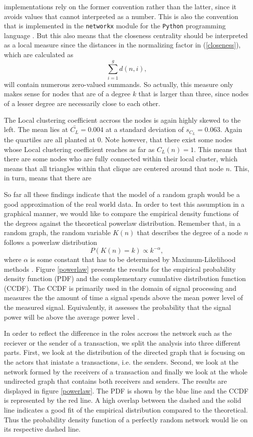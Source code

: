 \noindent implementations rely on the former convention rather than the latter, since it avoids values that cannot interpreted as a number. This is also the convention that is implemented in the \texttt{networkx} module for the \texttt{Python} programming language \cite{networkx}. But this also means that the closeness centrality should be interpreted as a local measure since the distances in the normalizing factor in (\ref{closeness}), which are calculated as $$\sum\limits_{i=1}^g d(n, i),$$ will contain numerous zero-valued summands. So actually, this measure only makes sense for nodes that are of a degree $k$ that is larger than three, since nodes of a lesser degree are necessarily close to each other.

The Local clustering coefficient accross the nodes is again highly skewed to the left. The mean lies at $\bar{C_L}=0.004$ at a standard deviation of $s_{C_L}=0.063$. Again the quartiles are all planted at $0$. Note however, that there exist some nodes whose Local clustering coefficient reaches as far as $C_L(n)=1$. This means that there are some nodes who are fully connected within their local cluster, which means that all triangles within that clique are centered around that node $n$. This, in turn, means that there are

So far all these findings indicate that the model of a random graph would be a good approximation of the real world data. In order to test this assumption in a graphical manner, we would like to compare the empirical density functions of the degrees against the theoretical powerlaw distribution. Remember that, in a random graph, the random variable $K(n)$ that describes the degree of a node $n$ follows a powerlaw distribution $$P(K(n)=k)\propto k^{-\alpha},$$ where $\alpha$ is some constant that has to be determined by Maximum-Likelihood methods \cite{graphintro}. Figure \ref{powerlaw} presents the results for the empirical probability density function (PDF) and the complementary cumulative distribution function (CCDF). The CCDF is primarily used in the domain of signal processing and measures the the amount of time a signal spends above the mean power level of the measured signal. Equivalently, it assesses the probability that the signal power will be above the average power level \cite{ccdf2015}.

In order to reflect the difference in the roles accross the network such as the reciever or the sender of a transaction, we split the analysis into three different parts. First, we look at the distribution of the directed graph that is focusing on the actors that iniatate a transactions, i.e. the senders. Second, we look at the network formed by the receivers of a transaction and finally we look at the whole undirected graph that contains both receivers and senders. The results are displayed in figure \ref{powerlaw}. The PDF is shown by the blue line and the CCDF is represented by the red line. A high overlap between the dashed and the solid line indicates a good fit of the empirical distribution compared to the theoretical. Thus the probability density function of a perfectly random network would lie on its respective dashed line.

